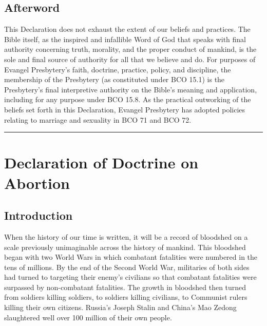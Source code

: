 \documentclass[
]{book}
\begin{document}
\hypertarget{afterword}{%
\section*{Afterword}\label{afterword}}

This Declaration does not exhaust the extent of our beliefs and practices. The Bible itself, as the inspired and infallible Word of God that speaks with final authority concerning truth, morality, and the proper conduct of mankind, is the sole and final source of authority for all that we believe and do. For purposes of Evangel Presbytery's faith, doctrine, practice, policy, and discipline, the membership of the Presbytery (as constituted under BCO 15.1) is the Presbytery's final interpretive authority on the Bible's meaning and application, including for any purpose under BCO 15.8. As the practical outworking of the beliefs set forth in this Declaration, Evangel Presbytery has adopted policies relating to marriage and sexuality in BCO 71 and BCO 72.

\begin{center}\rule{0.5\linewidth}{0.5pt}\end{center}

\hypertarget{declaration-of-doctrine-on-abortion}{%
\chapter*{Declaration of Doctrine on Abortion}\label{declaration-of-doctrine-on-abortion}}

\hypertarget{introduction-1}{%
\section*{Introduction}\label{introduction-1}}

When the history of our time is written, it will be a record of bloodshed on a scale previously unimaginable across the history of mankind. This bloodshed began with two World Wars in which combatant fatalities were numbered in the tens of millions. By the end of the Second World War, militaries of both sides had turned to targeting their enemy's civilians so that combatant fatalities were surpassed by non-combatant fatalities. The growth in bloodshed then turned from soldiers killing soldiers, to soldiers killing civilians, to Communist rulers killing their own citizens. Russia's Joseph Stalin and China's Mao Zedong slaughtered well over 100 million of their own people.
\end{document}
